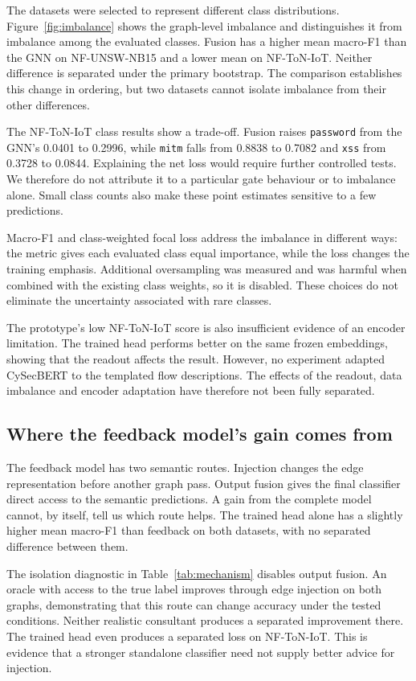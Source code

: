 The datasets were selected to represent different class distributions. Figure~\ref{fig:imbalance} shows the graph-level imbalance and distinguishes it from imbalance among the evaluated classes. Fusion has a higher mean macro-F1 than the GNN on NF-UNSW-NB15 and a lower mean on NF-ToN-IoT. Neither difference is separated under the primary bootstrap. The comparison establishes this change in ordering, but two datasets cannot isolate imbalance from their other differences.

The NF-ToN-IoT class results show a trade-off. Fusion raises \texttt{password} from the GNN's 0.0401 to 0.2996, while \texttt{mitm} falls from 0.8838 to 0.7082 and \texttt{xss} from 0.3728 to 0.0844. Explaining the net loss would require further controlled tests. We therefore do not attribute it to a particular gate behaviour or to imbalance alone. Small class counts also make these point estimates sensitive to a few predictions.

Macro-F1 and class-weighted focal loss address the imbalance in different ways: the metric gives each evaluated class equal importance, while the loss changes the training emphasis. Additional oversampling was measured and was harmful when combined with the existing class weights, so it is disabled. These choices do not eliminate the uncertainty associated with rare classes.

The prototype's low NF-ToN-IoT score is also insufficient evidence of an encoder limitation. The trained head performs better on the same frozen embeddings, showing that the readout affects the result. However, no experiment adapted CySecBERT to the templated flow descriptions. The effects of the readout, data imbalance and encoder adaptation have therefore not been fully separated.

\subsection{Where the feedback model's gain comes from}
\label{sec:disc-echo}

The feedback model has two semantic routes. Injection changes the edge representation before another graph pass. Output fusion gives the final classifier direct access to the semantic predictions. A gain from the complete model cannot, by itself, tell us which route helps. The trained head alone has a slightly higher mean macro-F1 than feedback on both datasets, with no separated difference between them.

The isolation diagnostic in Table~\ref{tab:mechanism} disables output fusion. An oracle with access to the true label improves through edge injection on both graphs, demonstrating that this route can change accuracy under the tested conditions. Neither realistic consultant produces a separated improvement there. The trained head even produces a separated loss on NF-ToN-IoT. This is evidence that a stronger standalone classifier need not supply better advice for injection.

